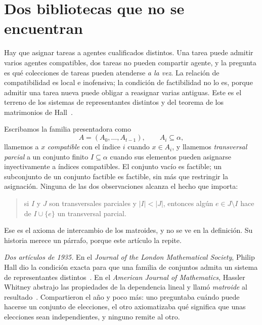 \documentclass[11pt]{article}
\begin{document}
\section{Dos bibliotecas que no se encuentran}\label{sec:intro}

Hay que asignar tareas a agentes cualificados distintos. Una tarea puede admitir varios agentes
compatibles, dos tareas no pueden compartir agente, y la pregunta es qué colecciones de tareas
pueden atenderse \emph{a la vez}. La relación de compatibilidad es local e inofensiva; la condición
de factibilidad no lo es, porque admitir una tarea nueva puede obligar a reasignar varias
antiguas. Este es el terreno de los sistemas de representantes distintos y del teorema de los
matrimonios de Hall~\cite{hall}.

Escribamos la familia presentadora como
\[
  A=(A_0,\dots,A_{t-1}),\qquad A_i\subseteq\alpha,
\]
llamemos a $x$ \emph{compatible} con el índice $i$ cuando $x\in A_i$, y llamemos \emph{transversal
parcial} a un conjunto finito $I\subseteq\alpha$ cuando sus elementos pueden asignarse
inyectivamente a índices compatibles. El conjunto vacío es factible; un subconjunto de un conjunto
factible es factible, sin más que restringir la asignación. Ninguna de las dos observaciones
alcanza el hecho que importa:

\begin{quote}
si $I$ y $J$ son transversales parciales y $|I|<|J|$, entonces algún $e\in J\setminus I$ hace de
$I\cup\{e\}$ un transversal parcial.
\end{quote}

Ese es el axioma de intercambio de los matroides, y no se ve en la definición. Su historia merece
un párrafo, porque este artículo la repite.

\emph{Dos artículos de 1935.} En el \emph{Journal of the London Mathematical Society}, Philip Hall
dio la condición exacta para que una familia de conjuntos admita un sistema de representantes
distintos~\cite{hall}. En el \emph{American Journal of Mathematics}, Hassler Whitney abstrajo las
propiedades de la dependencia lineal y llamó \emph{matroide} al resultado~\cite{whitney}.
Compartieron el año y poco más: uno preguntaba cuándo puede hacerse un conjunto de elecciones, el
otro axiomatizaba qué significa que unas elecciones sean independientes, y ninguno remite al otro.
\end{document}
